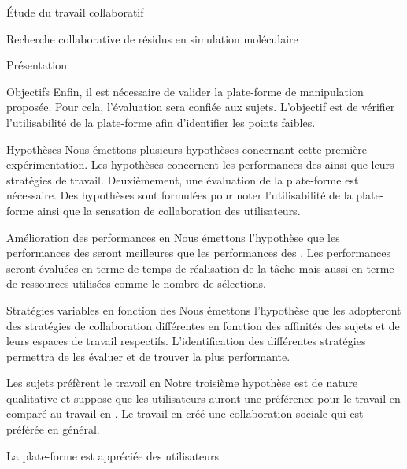 \documentclass[myfrancais]{mythesis}
\begin{document}
\begin{mypart}{Étude du travail collaboratif}
\begin{mychapter}{Recherche collaborative de résidus en simulation moléculaire}
\begin{mysection}{Présentation}
\begin{mysubsection}{Objectifs}
					Enfin, il est nécessaire de valider la plate-forme de manipulation proposée.
					Pour cela, l'évaluation sera confiée aux sujets.
					L'objectif est de vérifier l'utilisabilité de la plate-forme afin d'identifier les points faibles.
				\end{mysubsection}
				\begin{mysubsection}{Hypothèses}
					Nous émettons plusieurs hypothèses concernant cette première expérimentation.
					Les hypothèses concernent les performances des  ainsi que leurs stratégies de travail.
					Deuxièmement, une évaluation de la plate-forme est nécessaire.
					Des hypothèses sont formulées pour noter l'utilisabilité de la plate-forme ainsi que la sensation de collaboration des utilisateurs.
					\begin{myparagraph}{ Amélioration des performances en }
						Nous émettons l'hypothèse que les performances des  seront meilleures que les performances des .
						Les performances seront évaluées en terme de temps de réalisation de la tâche mais aussi en terme de ressources utilisées comme le nombre de sélections.
					\end{myparagraph}
					\begin{myparagraph}{ Stratégies variables en fonction des }
						Nous émettons l'hypothèse que les  adopteront des stratégies de collaboration différentes en fonction des affinités des sujets et de leurs espaces de travail respectifs.
						L'identification des différentes stratégies permettra de les évaluer et de trouver la plus performante.
					\end{myparagraph}
					\begin{myparagraph}{ Les sujets préfèrent le travail en }
						Notre troisième hypothèse est de nature qualitative et suppose que les utilisateurs auront une préférence pour le travail en  comparé au travail en .
						Le travail en  créé une collaboration sociale qui est préférée en général.
					\end{myparagraph}
					\begin{myparagraph}{ La plate-forme est appréciée des utilisateurs}

\end{myparagraph}
\end{mysubsection}
\end{mysection}
\end{mychapter}
\end{mypart}
\end{document}
